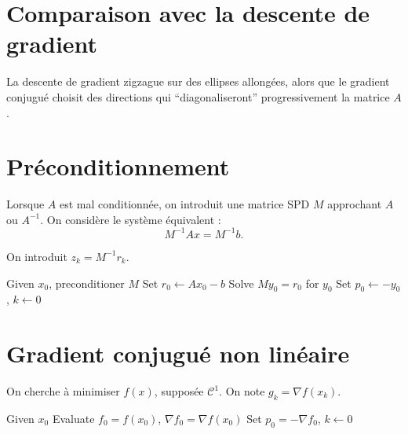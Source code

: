 \section{Comparaison avec la descente de gradient}

La descente de gradient zigzague sur des ellipses allongées, alors que le gradient conjugué choisit des directions qui ``diagonaliseront'' progressivement la matrice $A$.

\section{Préconditionnement}

Lorsque $A$ est mal conditionnée, on introduit une matrice SPD $M$
approchant $A$ ou $A^{-1}$.  
On considère le système équivalent :
\[
M^{-1} A x = M^{-1} b.
\]

On introduit $z_k = M^{-1} r_k$.

\begin{algorithm}[H]
\caption{Gradient Conjugué Préconditionné}
\label{alg:pcg}
Given $x_0$, preconditioner $M$\;
Set $r_0 \leftarrow Ax_0 - b$\;
Solve $My_0 = r_0$ for $y_0$\;
Set $p_0 \leftarrow -y_0$, $k \leftarrow 0$\;
\end{algorithm}
\section{Gradient conjugué non linéaire}

On cherche à minimiser $f(x)$, supposée $\mathcal{C}^1$.  
On note $g_k = \nabla f(x_k)$.

\begin{algorithm}[H]
\caption{Méthode de Fletcher-Reeves}
\label{alg:fletcher-reeves}
Given $x_0$\;
Evaluate $f_0 = f(x_0)$, $\nabla f_0 = \nabla f(x_0)$\;
Set $p_0 = -\nabla f_0$, $k \leftarrow 0$\;
\end{algorithm}

